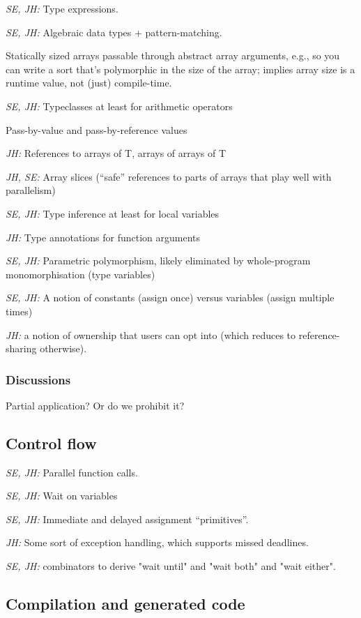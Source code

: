 \documentclass{article}
\begin{document}
\textit{SE, JH:} Type expressions.

\textit{SE, JH:} Algebraic data types + pattern-matching.

Statically sized arrays passable through abstract array arguments, e.g., so you
can write a sort that's polymorphic in the size of the array; implies array size
is a runtime value, not (just) compile-time.

\textit{SE, JH:} Typeclasses at least for arithmetic operators

Pass-by-value and pass-by-reference values

\textit{JH:} References to arrays of T, arrays of arrays of T

\textit{JH, SE:} Array slices (``safe'' references to parts of arrays that play
well with parallelism)

\textit{SE, JH:} Type inference at least for local variables

\textit{JH:} Type annotations for function arguments

\textit{SE, JH:} Parametric polymorphism, likely eliminated by whole-program
monomorphisation (type variables)

\textit{SE, JH:} A notion of constants (assign once) versus variables (assign
multiple times)

\textit{JH:} a notion of ownership that users can opt into (which reduces to
reference-sharing otherwise).

\subsubsection{Discussions}

Partial application?  Or do we prohibit it?

\subsection{Control flow}

\textit{SE, JH:} Parallel function calls.

\textit{SE, JH:} Wait on variables

\textit{SE, JH:} Immediate and delayed assignment ``primitives''.

\textit{JH:} Some sort of exception handling, which supports missed deadlines.

\textit{SE, JH:} combinators to derive "wait until" and "wait both" and "wait either".

\subsection{Compilation and generated code}
\end{document}
